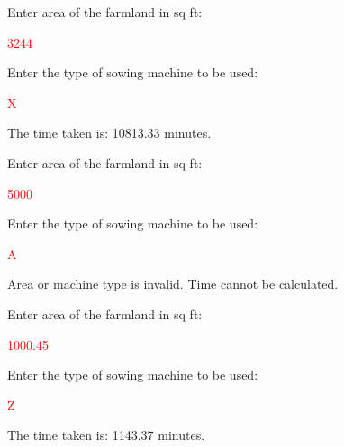 \begin{sample}
Enter area of the farmland in sq ft:

 \textcolor{red}{3244}
 
Enter the type of sowing machine to be used:

 \textcolor{red}{X}
 
The time taken is: 10813.33 minutes.

\end{sample}

\begin{sample}
Enter area of the farmland in sq ft:

 \textcolor{red}{5000}
 
Enter the type of sowing machine to be used:

 \textcolor{red}{A}
 
Area or machine type is invalid. Time cannot be calculated.
\end{sample}

\begin{sample}
Enter area of the farmland in sq ft:

 \textcolor{red}{1000.45}
 
Enter the type of sowing machine to be used:

 \textcolor{red}{Z}
 
The time taken is: 1143.37 minutes.

\end{sample}




